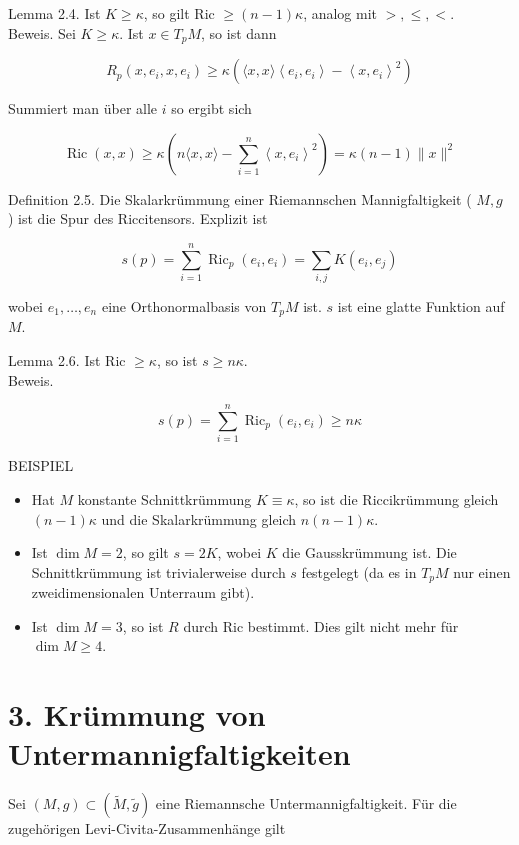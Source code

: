 \documentclass[10pt]{article}
\begin{document}
Lemma 2.4. Ist $K \geq \kappa$, so gilt Ric $\geq(n-1) \kappa$, analog mit $>, \leq,<$.\\
Beweis. Sei $K \geq \kappa$. Ist $x \in T_{p} M$, so ist dann

$$
R_{p}\left(x, e_{i}, x, e_{i}\right) \geq \kappa\left(\langle x, x\rangle\left\langle e_{i}, e_{i}\right\rangle-\left\langle x, e_{i}\right\rangle^{2}\right)
$$

Summiert man über alle $i$ so ergibt sich

$$
\operatorname{Ric}(x, x) \geq \kappa\left(n\langle x, x\rangle-\sum_{i=1}^{n}\left\langle x, e_{i}\right\rangle^{2}\right)=\kappa(n-1)\|x\|^{2}
$$

Definition 2.5. Die Skalarkrümmung einer Riemannschen Mannigfaltigkeit ( $M, g$ ) ist die Spur des Riccitensors. Explizit ist

$$
s(p)=\sum_{i=1}^{n} \operatorname{Ric}_{p}\left(e_{i}, e_{i}\right)=\sum_{i, j} K\left(e_{i}, e_{j}\right)
$$

wobei $e_{1}, \ldots, e_{n}$ eine Orthonormalbasis von $T_{p} M$ ist. $s$ ist eine glatte Funktion auf $M$.

Lemma 2.6. Ist Ric $\geq \kappa$, so ist $s \geq n \kappa$.\\
Beweis.

$$
s(p)=\sum_{i=1}^{n} \operatorname{Ric}_{p}\left(e_{i}, e_{i}\right) \geq n \kappa
$$

BEISPIEL

\begin{itemize}
  \item Hat $M$ konstante Schnittkrümmung $K \equiv \kappa$, so ist die Riccikrümmung gleich $(n-1) \kappa$ und die Skalarkrümmung gleich $n(n-1) \kappa$.
  \item Ist $\operatorname{dim} M=2$, so gilt $s=2 K$, wobei $K$ die Gausskrümmung ist. Die Schnittkrümmung ist trivialerweise durch $s$ festgelegt (da es in $T_{p} M$ nur einen zweidimensionalen Unterraum gibt).
  \item Ist $\operatorname{dim} M=3$, so ist $R$ durch Ric bestimmt. Dies gilt nicht mehr für $\operatorname{dim} M \geq 4$.
\end{itemize}

\section*{3. Krümmung von Untermannigfaltigkeiten}
Sei $(M, g) \subset(\tilde{M}, \tilde{g})$ eine Riemannsche Untermannigfaltigkeit. Für die zugehörigen Levi-Civita-Zusammenhänge gilt
\end{document}
